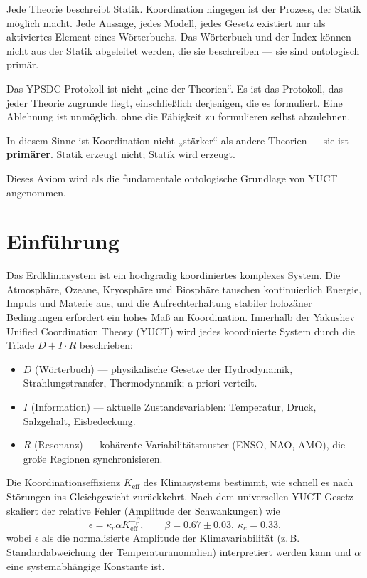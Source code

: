 \documentclass[12pt,a4paper]{article}
\newcommand{\Keff}{K_{\mathrm{eff}}}
\newcommand{\kappac}{\kappa_c}
\newcommand{\be}{\beta}
\begin{document}
	Jede Theorie beschreibt Statik. Koordination hingegen ist der Prozess, der Statik möglich macht.
	Jede Aussage, jedes Modell, jedes Gesetz existiert nur als aktiviertes Element eines Wörterbuchs.
	Das Wörterbuch und der Index können nicht aus der Statik abgeleitet werden, die sie beschreiben — sie sind ontologisch primär.
	
	Das YPSDC-Protokoll ist nicht „eine der Theorien“.
	Es ist das Protokoll, das jeder Theorie zugrunde liegt, einschließlich derjenigen, die es formuliert.
	Eine Ablehnung ist unmöglich, ohne die Fähigkeit zu formulieren selbst abzulehnen.
	
	In diesem Sinne ist Koordination nicht „stärker“ als andere Theorien — sie ist \textbf{primärer}.
	Statik erzeugt nicht; Statik wird erzeugt.
	
	Dieses Axiom wird als die fundamentale ontologische Grundlage von YUCT angenommen.
	
	\section{Einführung}
	
	Das Erdklimasystem ist ein hochgradig koordiniertes komplexes System. Die Atmosphäre, Ozeane, Kryosphäre und Biosphäre tauschen kontinuierlich Energie, Impuls und Materie aus, und die Aufrechterhaltung stabiler holozäner Bedingungen erfordert ein hohes Maß an Koordination. Innerhalb der Yakushev Unified Coordination Theory (YUCT) wird jedes koordinierte System durch die Triade \(D + I \cdot R\) beschrieben:
	
	\begin{itemize}
		\item \(D\) (Wörterbuch) — physikalische Gesetze der Hydrodynamik, Strahlungstransfer, Thermodynamik; a priori verteilt.
		\item \(I\) (Information) — aktuelle Zustandsvariablen: Temperatur, Druck, Salzgehalt, Eisbedeckung.
		\item \(R\) (Resonanz) — kohärente Variabilitätsmuster (ENSO, NAO, AMO), die große Regionen synchronisieren.
	\end{itemize}
	
	Die Koordinationseffizienz \(\Keff\) des Klimasystems bestimmt, wie schnell es nach Störungen ins Gleichgewicht zurückkehrt. Nach dem universellen YUCT-Gesetz skaliert der relative Fehler (Amplitude der Schwankungen) wie
	\[
	\epsilon = \kappac \alpha \Keff^{-\be}, \qquad \be = 0.67 \pm 0.03,\ \kappac = 0.33,
	\]
	wobei \(\epsilon\) als die normalisierte Amplitude der Klimavariabilität (z. B. Standardabweichung der Temperaturanomalien) interpretiert werden kann und \(\alpha\) eine systemabhängige Konstante ist.
	
\end{document}
